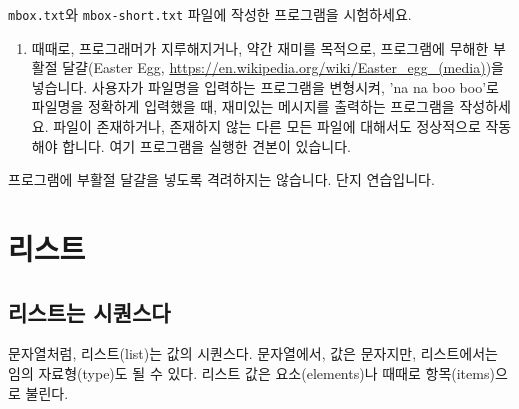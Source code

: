 \documentclass[
  letterpaper,
]{book}
\newenvironment{Shaded}{\begin{snugshade}}{\end{snugshade}}
\newcommand{\ConstantTok}[1]{\textcolor[rgb]{0.56,0.35,0.01}{#1}}
\newcommand{\ControlFlowTok}[1]{\textcolor[rgb]{0.00,0.23,0.31}{\textbf{#1}}}
\newcommand{\DecValTok}[1]{\textcolor[rgb]{0.68,0.00,0.00}{#1}}
\newcommand{\NormalTok}[1]{\textcolor[rgb]{0.00,0.23,0.31}{#1}}
\newcommand{\SpecialCharTok}[1]{\textcolor[rgb]{0.37,0.37,0.37}{#1}}
\newcommand{\StringTok}[1]{\textcolor[rgb]{0.13,0.47,0.30}{#1}}
\providecommand{\tightlist}{%
  \setlength{\itemsep}{0pt}\setlength{\parskip}{0pt}}\usepackage{longtable,booktabs,array}
\begin{document}
\texttt{mbox.txt}와 \texttt{mbox-short.txt} 파일에 작성한 프로그램을
시험하세요.

\begin{enumerate}
\def\labelenumi{\arabic{enumi}.}
\setcounter{enumi}{2}
\tightlist
\item
  때때로, 프로그래머가 지루해지거나, 약간 재미를 목적으로, 프로그램에
  무해한 부활절 달걀(Easter Egg,
  \url{https://en.wikipedia.org/wiki/Easter_egg_(media)})을 넣습니다.
  사용자가 파일명을 입력하는 프로그램을 변형시켜, 'na na boo boo'로
  파일명을 정확하게 입력했을 때, 재미있는 메시지를 출력하는 프로그램을
  작성하세요. 파일이 존재하거나, 존재하지 않는 다른 모든 파일에 대해서도
  정상적으로 작동해야 합니다. 여기 프로그램을 실행한 견본이 있습니다.
\end{enumerate}

\begin{Shaded}
\end{Shaded}

프로그램에 부활절 달걀을 넣도록 격려하지는 않습니다. 단지 연습입니다.

\chapter{리스트}\label{r-list}

 

\section{리스트는 시퀀스다}\label{r-list-sequence}

문자열처럼, 리스트(list)는 값의 시퀀스다. 문자열에서, 값은 문자지만,
리스트에서는 임의 자료형(type)도 될 수 있다. 리스트 값은
요소(elements)나 때때로 항목(items)으로 불린다. 
 
\end{document}
